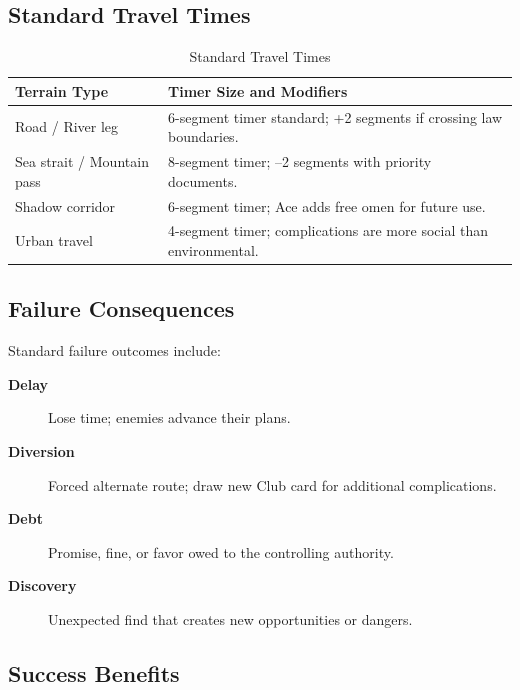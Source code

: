 \subsection{Standard Travel Times}\label{subsec:travel_times}

\begin{longtable}{p{4cm}p{10cm}}
\caption{Standard Travel Times}\label{tab:travel_times}\\
\toprule
\textbf{Terrain Type} & \textbf{Timer Size and Modifiers} \\
\midrule
Road / River leg & 6-segment timer standard; +2 segments if crossing law boundaries. \\
Sea strait / Mountain pass & 8-segment timer; --2 segments with priority documents. \\
Shadow corridor & 6-segment timer; Ace adds free omen for future use. \\
Urban travel & 4-segment timer; complications are more social than environmental. \\
\bottomrule
\end{longtable}

\subsection{Failure Consequences}\label{subsec:failure_consequences}

Standard failure outcomes include:
\begin{description}
    \item[\textbf{Delay}] Lose time; enemies advance their plans.
    \item[\textbf{Diversion}] Forced alternate route; draw new Club card for additional complications.
    \item[\textbf{Debt}] Promise, fine, or favor owed to the controlling authority.
    \item[\textbf{Discovery}] Unexpected find that creates new opportunities or dangers.
\end{description}

\subsection{Success Benefits}\label{subsec:success_benefits}

